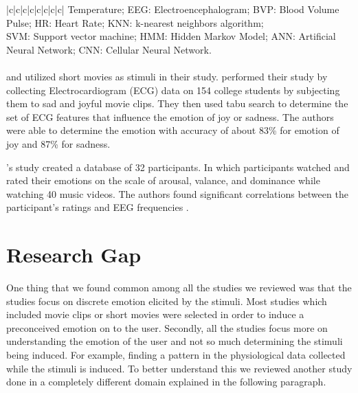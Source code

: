 \begin{center}
{\begin{tabular}{ |c|c|c|c|c|c|c|c| }
 {Temperature; EEG: Electroencephalogram; BVP: Blood Volume Pulse; HR: Heart Rate; KNN: k-nearest neighbors algorithm;} \\
 {SVM: Support vector machine; HMM: Hidden Markov Model; ANN: Artificial Neural Network; CNN: Cellular Neural Network.} \\
\hline
\end{tabular}}
\label{tab:lr_emotional recognition}
\end{center}

\paragraph{} \citeauthor{w_wen_2014} \cite{w_wen_2014} \cite{wan_wen_2009} and \citeauthor{koelstra_deap:_2012} \cite{koelstra_deap:_2012} utilized short movies as stimuli in their study. \citeauthor{wan_wen_2009} performed their study by collecting Electrocardiogram (ECG) data on 154 college students by subjecting them to sad and joyful movie clips. They then used tabu search to determine the set of ECG features that influence the emotion of joy or sadness. The authors were able to determine the emotion with accuracy of about 83\% for emotion of joy and 87\% for sadness.

\citeauthor{koelstra_deap:_2012}'s study created a database of 32 participants. In which participants watched and rated their emotions on the scale of arousal, valance, and dominance while watching 40 music videos. The authors found significant correlations between the participant's ratings and EEG frequencies \cite{koelstra_deap:_2012}. 

\section{Research Gap} One thing that we found common among all the studies we reviewed was that the studies focus on discrete emotion elicited by the stimuli. Most studies which included movie clips or short movies were selected in order to induce a preconceived emotion on to the user. Secondly, all the studies focus more on understanding the emotion of the user and not so much determining the stimuli being induced. For example, finding a pattern in the physiological data collected while the stimuli is induced. To better understand this we reviewed another study done in a completely different domain explained in the following paragraph.

